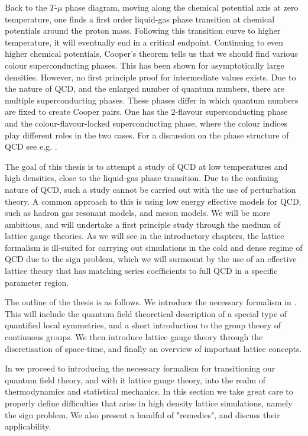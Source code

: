 Back to the $T$-$\mu$ phase diagram, moving along the chemical potential axis at
zero temperature, one finds a first order liquid-gas phase transition at chemical
potentials around the proton mass.  Following this transition curve to higher
temperature, it will eventually end in a critical endpoint. Continuing to even
higher chemical potentials, Cooper's theorem tells us that we should find
various colour superconducting phases. This has been shown for asymptotically
large densities. However, no first principle proof for intermediate values
exists. Due to the nature of QCD, and the enlarged number of quantum numbers,
there are multiple superconducting phases. These phases differ in which
quantum numbers are fixed to create Cooper pairs. One has the $2$-flavour
superconducting phase and the colour-flavour-locked superconducting phase, where
the colour indices play different roles in the two cases. For a discussion on the
phase structure of QCD see e.g.  \citep{Rajagopal:2000wf,Rischke:2003mt}.

The goal of this thesis is to attempt a study of QCD at low temperatures and
high densities, close to the liquid-gas phase transition. Due to the confining
nature of QCD, such a study cannot be carried out with the use of perturbation
theory. A common approach to this is using low energy effective models
for QCD, such as hadron gas resonant models, and meson models. We will be more
ambitious, and will undertake a first principle study through the medium
of lattice gauge theories. As we will see in the introductory chapters, the
lattice formalism is ill-suited for carrying out simulations in the cold and
dense regime of QCD due to the sign problem, which we will surmount by the use
of an effective lattice theory that has matching series coefficients to full QCD
in a specific parameter region.

The outline of the thesis is as follows. We introduce the necessary
formalism in . This will include the quantum field theoretical
description of a special type of quantified local symmetries, and a short
introduction to the group theory of continuous groups. We then introduce lattice
gauge theory through the discretisation of space-time, and finally an overview
of important lattice concepts.

In  we proceed to introducing the necessary formalism for
transitioning our quantum field theory, and with it lattice gauge theory, into
the realm of thermodynamics and statistical mechanics. In this section we take
great care to properly define difficulties that arise in high density lattice
simulations, namely the sign problem. We also present a handful of "remedies",
and discuss their applicability.

